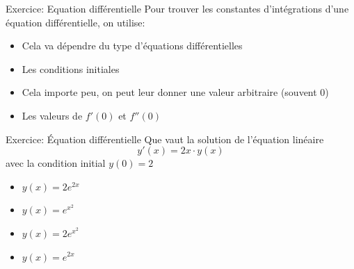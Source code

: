 \documentclass[xcolor=table]{beamer}
\begin{document}
\begin{frame}{Exercice: Equation différentielle}
    Pour trouver les constantes d'intégrations d'une équation différentielle, on utilise:
    \begin{itemize}
        \item Cela va dépendre du type d'équations différentielles
        \item Les conditions initiales
        \item Cela importe peu, on peut leur donner une valeur arbitraire (souvent 0)
        \item Les valeurs de $f'(0)$ et $f''(0)$
    \end{itemize}
\end{frame}

\begin{frame}{Exercice: Équation différentielle}
Que vaut la solution de l'équation linéaire \[ y'(x) = 2x \cdot y(x)\] avec la condition initial $y(0) = 2$
\begin{itemize}
        \item $y(x) = 2e^{2x}$
        \item $y(x) = e^{x^2}$
        \item $y(x) = 2e^{x^2}$
        \item $y(x) = e^{2x}$
    \end{itemize}
    
\end{frame}
\end{document}
